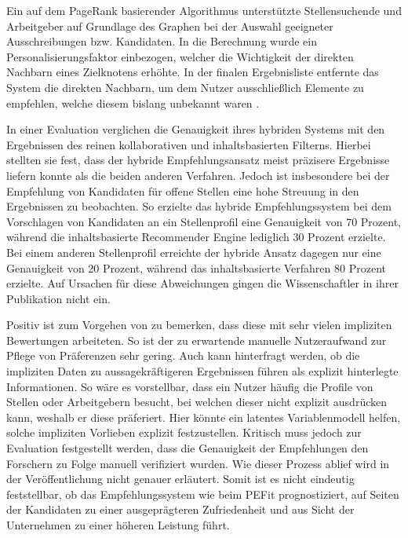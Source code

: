 Ein auf dem PageRank basierender Algorithmus unterstützte Stellensuchende und Arbeitgeber auf Grundlage des Graphen bei der Auswahl geeigneter Ausschreibungen bzw. Kandidaten. In die Berechnung wurde ein Personalisierungsfaktor einbezogen, welcher die Wichtigkeit der direkten Nachbarn eines Zielknotens erhöhte. In der finalen Ergebnisliste entfernte das System die direkten Nachbarn, um dem Nutzer ausschließlich Elemente zu empfehlen, welche diesem bislang unbekannt waren \cite[S. 3]{lu:2013}.

In einer Evaluation verglichen \textcite[S. 3f.]{lu:2013} die Genauigkeit ihres hybriden Systems mit den Ergebnissen des reinen kollaborativen und inhaltsbasierten Filterns. Hierbei stellten sie fest, dass der hybride Empfehlungsansatz meist präzisere Ergebnisse liefern konnte als die beiden anderen Verfahren. Jedoch ist insbesondere bei der Empfehlung von Kandidaten für offene Stellen eine hohe Streuung in den Ergebnissen zu beobachten. So erzielte das hybride Empfehlungssystem bei dem Vorschlagen von Kandidaten an ein Stellenprofil eine Genauigkeit von 70 Prozent, während die inhaltsbasierte Recommender Engine lediglich 30 Prozent erzielte. Bei einem anderen Stellenprofil erreichte der hybride Ansatz dagegen nur eine Genauigkeit von 20 Prozent, während das inhaltsbasierte Verfahren 80 Prozent erzielte. Auf Ursachen für diese Abweichungen gingen die Wissenschaftler in ihrer Publikation nicht ein.

Positiv ist zum Vorgehen von \textcite[S. 1ff.]{lu:2013} zu bemerken, dass diese mit sehr vielen impliziten Bewertungen arbeiteten. So ist der zu erwartende manuelle Nutzeraufwand zur Pflege von Präferenzen sehr gering. Auch kann hinterfragt werden, ob die impliziten Daten zu aussagekräftigeren Ergebnissen führen als explizit hinterlegte Informationen. So wäre es vorstellbar, dass ein Nutzer häufig die Profile von Stellen oder Arbeitgebern besucht, bei welchen dieser nicht explizit ausdrücken kann, weshalb er diese präferiert. Hier könnte ein latentes Variablenmodell helfen, solche impliziten Vorlieben explizit festzustellen. Kritisch muss jedoch zur Evaluation festgestellt werden, dass die Genauigkeit der Empfehlungen den Forschern zu Folge manuell verifiziert wurden. Wie dieser Prozess ablief wird in der Veröffentlichung nicht genauer erläutert. Somit ist es nicht eindeutig feststellbar, ob das Empfehlungssystem wie beim \ac{PEFit} prognostiziert, auf Seiten der Kandidaten zu einer ausgeprägteren Zufriedenheit und aus Sicht der Unternehmen zu einer höheren Leistung führt.
